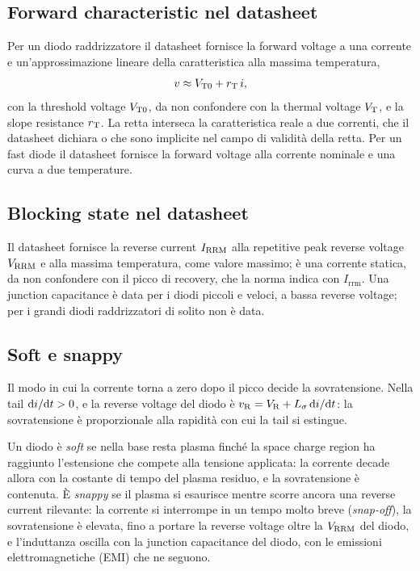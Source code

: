 \documentclass[10pt,a4paper]{scrartcl}
\let\newcommand\pdvaluedefine
\newcommand{\VR}{V_\mathrm{R}}
\newcommand{\VT}{V_\mathrm{T}}
\newcommand{\VTo}{V_\mathrm{T0}}
\newcommand{\rT}{r_\mathrm{T}}
\newcommand{\Vrrm}{V_\mathrm{RRM}}
\newcommand{\Irrm}{I_\mathrm{RRM}}
\newcommand{\diff}{\mathrm{d}}
\newcommand{\Ls}{L_\sigma}                    %
\begin{document}
\subsection{Forward characteristic nel datasheet}
Per un diodo raddrizzatore il datasheet fornisce la forward voltage a una corrente e un'approssimazione lineare della caratteristica alla massima temperatura,
\begin{equation}
v \approx \VTo + \rT\, i ,
\label{eq:line}
\end{equation}
con la threshold voltage $\VTo$, da non confondere con la thermal voltage $\VT$, e la slope resistance $\rT$. La retta interseca la caratteristica reale a due correnti, che il datasheet dichiara o che sono implicite nel campo di validità della retta. Per un fast diode il datasheet fornisce la forward voltage alla corrente nominale e una curva a due temperature.

\subsection{Blocking state nel datasheet}
Il datasheet fornisce la reverse current $\Irrm$ alla repetitive peak reverse voltage $\Vrrm$ e alla massima temperatura, come valore massimo; è una corrente statica, da non confondere con il picco di recovery, che la norma indica con $I_\mathrm{rrm}$. Una junction capacitance è data per i diodi piccoli e veloci, a bassa reverse voltage; per i grandi diodi raddrizzatori di solito non è data.
\subsection{Soft e snappy}
\label{sec:softsnappy}
Il modo in cui la corrente torna a zero dopo il picco decide la sovratensione. Nella tail $\diff i/\diff t > 0$, e la reverse voltage del diodo è $v_\mathrm{R} = \VR + \Ls\,\diff i/\diff t$: la sovratensione è proporzionale alla rapidità con cui la tail si estingue.

Un diodo è \emph{soft} se nella base resta plasma finché la space charge region ha raggiunto l'estensione che compete alla tensione applicata: la corrente decade allora con la costante di tempo del plasma residuo, e la sovratensione è contenuta. È \emph{snappy} se il plasma si esaurisce mentre scorre ancora una reverse current rilevante: la corrente si interrompe in un tempo molto breve (\emph{snap-off}), la sovratensione è elevata, fino a portare la reverse voltage oltre la $\Vrrm$ del diodo, e l'induttanza oscilla con la junction capacitance del diodo, con le emissioni elettromagnetiche (EMI) che ne seguono.
\end{document}
